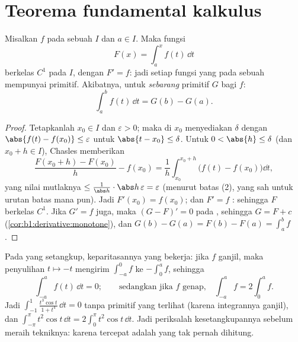 \section{Teorema fundamental kalkulus}

\begin{theorem}\label{thm:b1:integration:ftc}
Misalkan $f$  pada sebuah  $I$ dan $a \in I$. Maka fungsi
\[
F(x) = \int_a^x f(t)\, \dd t
\]
berkelas $C^1$ pada $I$, dengan $F' = f$: jadi setiap fungsi yang 
pada sebuah  mempunyai primitif. Akibatnya, untuk \emph{sebarang}
primitif $G$ bagi $f$:
\[
\int_a^b f(t)\,\dd t = G(b) - G(a) .
\]
\end{theorem}

\begin{proof}
Tetapkanlah $x_0 \in I$ dan $\varepsilon > 0$; maka  di $x_0$ menyediakan
$\delta$ dengan $\abs{f(t) - f(x_0)} \leq \varepsilon$ untuk $\abs{t -
x_0} \leq \delta$. Untuk $0 < \abs{h} \leq \delta$ (dan $x_0 + h \in
I$), Chasles memberikan
\[
\frac{F(x_0 + h) - F(x_0)}{h} - f(x_0)
= \frac 1h \int_{x_0}^{x_0+h} \bigl(f(t) - f(x_0)\bigr)\dd t ,
\]
yang nilai mutlaknya $\leq \frac{1}{\abs h}\cdot \abs h\,
\varepsilon = \varepsilon$ (menurut batas (2), yang sah untuk urutan
batas mana pun). Jadi $F'(x_0) = f(x_0)$; dan $F' = f$ : sehingga $F$
berkelas $C^1$. Jika $G' = f$ juga, maka $(G - F)' = 0$ pada , sehingga $G =
F + c$ (\cref{cor:b1:derivative:monotone}), dan $G(b) - G(a) = F(b)
- F(a) = \int_a^b f$.
\end{proof}

\begin{example}\label{ex:b1:integration:parity}
Pada  yang setangkup, keparitasannya yang bekerja: jika $f$ ganjil,
maka penyulihan $t \mapsto -t$ mengirim $\int_{-a}^{0} f$ ke
$-\int_0^a f$, sehingga
\[
\int_{-a}^{a} f(t)\,\dd t = 0 ;
\qquad\text{sedangkan jika $f$ genap,}\quad
\int_{-a}^{a} f = 2\int_0^a f .
\]
Jadi $\int_{-1}^{1} \frac{t^3\cos t}{1 + t^4}\,\dd t = 0$ tanpa
primitif yang terlihat (karena integrannya ganjil), dan
$\int_{-\pi}^{\pi} t^2\cos t\,\dd t = 2\int_0^\pi t^2\cos t\,
\dd t$. Jadi periksalah kesetangkupannya sebelum meraih tekniknya: karena
 tercepat adalah yang tak pernah dihitung.
\end{example}

